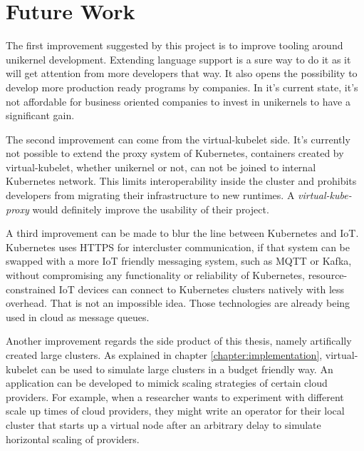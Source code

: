 \section{Future Work}
The first improvement suggested by this project is to improve tooling around unikernel development. Extending language support is a sure way to do it as it will get attention from more developers that way. It also opens the possibility to develop more production ready programs by companies. In it's current state, it's not affordable for business oriented companies to invest in unikernels to have a significant gain.

The second improvement can come from the virtual-kubelet side. It's currently not possible to extend the proxy system of Kubernetes, containers created by virtual-kubelet, whether unikernel or not, can not be joined to internal Kubernetes network. This limits interoperability inside the cluster and prohibits developers from migrating their infrastructure to new runtimes. A \textit{virtual-kube-proxy} would definitely improve the usability of their project.

A third improvement can be made to blur the line between Kubernetes and IoT. Kubernetes uses HTTPS for intercluster communication, if that system can be swapped with a more IoT friendly messaging system, such as MQTT or Kafka, without compromising any functionality or reliability of Kubernetes, resource-constrained IoT devices can connect to Kubernetes clusters natively with less overhead. That is not an impossible idea. Those technologies are already being used in cloud as message queues.

Another improvement regards the side product of this thesis, namely artifically created large clusters. As explained in chapter \ref{chapter:implementation}, virtual-kubelet can be used to simulate large clusters in a budget friendly way. An application can be developed to mimick scaling strategies of certain cloud providers. For example, when a researcher wants to experiment with different scale up times of cloud providers, they might write an operator for their local cluster that starts up a virtual node after an arbitrary delay to simulate horizontal scaling of providers.